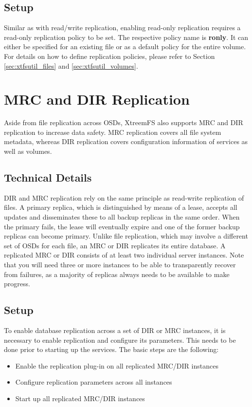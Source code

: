 \documentclass[a4paper,10pt]{book}
\begin{document}
\subsection{Setup}
Similar as with read/write replication, enabling read-only replication requires a read-only replication policy to be set. The respective policy name is \textbf{ronly}. It can either be specified for an existing file or as a default policy for the entire volume. For details on how to define replication policies, please refer to Section \ref{sec:xtfsutil_files} and \ref{sec:xtfsutil_volumes}.


\section{MRC and DIR Replication}
Aside from file replication across OSDs, XtreemFS also supports MRC and DIR replication to increase data safety. MRC replication covers all file system metadata, whereas DIR replication covers configuration information of services as well as volumes.

\subsection{Technical Details}
DIR and MRC replication rely on the same principle as read-write replication of files. A primary replica, which is distinguished by means of a lease, accepts all updates and disseminates these to all backup replicas in the same order. When the primary fails, the lease will eventually expire and one of the former backup replicas can become primary. Unlike file replication, which may involve a different set of OSDs for each file, an MRC or DIR replicates its entire database. A replicated MRC or DIR consists of at least two individual server instances. Note that you will need three or more instances to be able to transparently recover from failures, as a majority of replicas always needs to be available to make progress.

\subsection{Setup}
To enable database replication across a set of DIR or MRC instances, it is necessary to enable replication and configure its parameters. This needs to be done prior to starting up the services. The basic steps are the following:

\begin{itemize}
 \item Enable the replication plug-in on all replicated MRC/DIR instances
 \item Configure replication parameters across all instances
 \item Start up all replicated MRC/DIR instances
\end{itemize}
\end{document}
